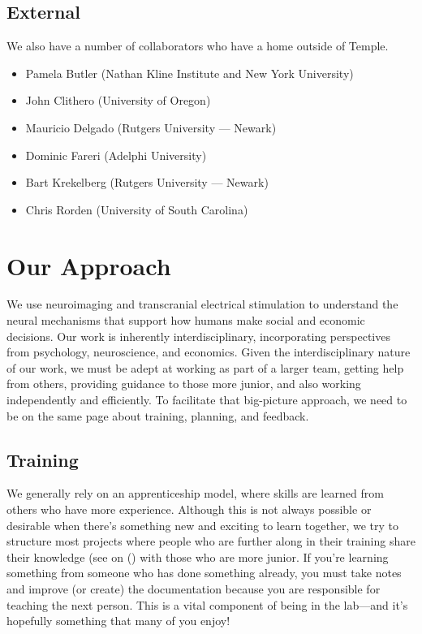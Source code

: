 \documentclass[letterpaper,11pt,oneside]{memoir}
\begin{document}
\subsection{External}

We also have a number of collaborators who have a home outside of Temple. \\

\begin{itemize}[noitemsep,nolistsep]
\item Pamela Butler (Nathan Kline Institute and New York University)
\item John Clithero (University of Oregon)
\item Mauricio Delgado (Rutgers University --- Newark)
\item Dominic Fareri (Adelphi University)
\item Bart Krekelberg (Rutgers University --- Newark)
\item Chris Rorden (University of South Carolina) 
\end{itemize}


\section{Our Approach}
We use neuroimaging and transcranial electrical stimulation to understand the neural mechanisms that support how humans make social and economic decisions. Our work is inherently interdisciplinary, incorporating perspectives from psychology, neuroscience, and economics. Given the interdisciplinary nature of our work, we must be adept at working as part of a larger team, getting help from others, providing guidance to those more junior, and also working independently and efficiently. To facilitate that big-picture approach, we need to be on the same page about training, planning, and feedback. 

\subsection{Training}
\label{sec:training}
We generally rely on an apprenticeship model, where skills are learned from others who have more experience. Although this is not always possible or desirable when there's something new and exciting to learn together, we try to structure most projects where people who are further along in their training share their knowledge (see  on () with those who are more junior. If you're learning something from someone who has done something already, you must take notes and improve (or create) the documentation because you are responsible for teaching the next person. This is a vital component of being in the lab---and it's hopefully something that many of you enjoy!
\end{document}
